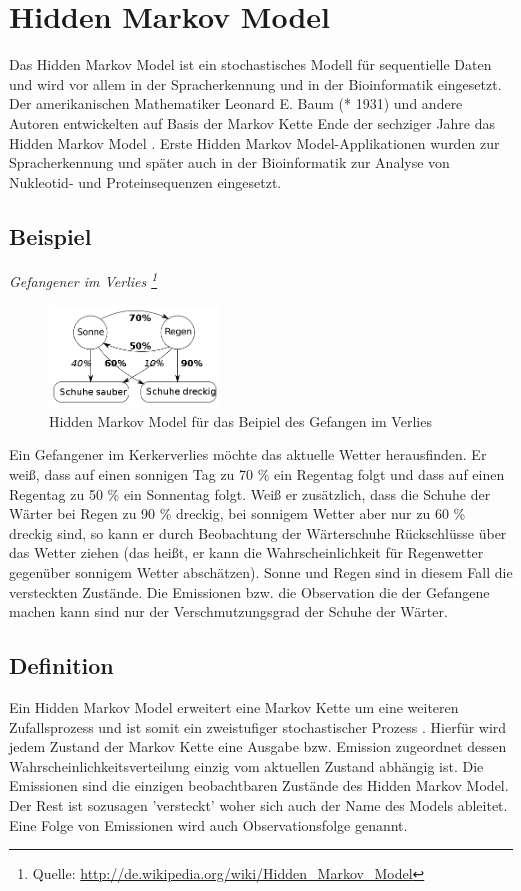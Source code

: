 \chapter{Hidden Markov Model}
\label{mainsec:hmm}

Das Hidden Markov Model ist ein stochastisches Modell für sequentielle Daten und wird vor allem in der Spracherkennung und in der Bioinformatik eingesetzt. 
Der amerikanischen Mathematiker Leonard E. Baum (* 1931) und andere Autoren entwickelten auf Basis der Markov Kette Ende der 
sechziger Jahre das Hidden Markov Model \cite{baum66}. Erste Hidden Markov Model-Applikationen wurden zur Spracherkennung und später auch in der Bioinformatik zur Analyse von Nukleotid- und Proteinsequenzen eingesetzt. 

\section{Beispiel}
\textit{ Gefangener im Verlies \footnote{Quelle: \url{http://de.wikipedia.org/wiki/Hidden_Markov_Model}}} \\

\begin{figure}[htbp] \centering
    \includegraphics[width=0.4\textwidth]{Bilder/Kap3/hmm_example.png}
    \caption{Hidden Markov Model für das Beipiel des Gefangen im Verlies}
    \label{fig:hmm_example}
\end{figure}

Ein Gefangener im Kerkerverlies möchte das aktuelle Wetter herausfinden. Er weiß, dass auf einen sonnigen Tag zu 70 \% ein Regentag folgt und dass auf einen Regentag zu 50 \% ein Sonnentag folgt. Weiß er zusätzlich, dass die Schuhe der Wärter bei Regen zu 90 \% dreckig, bei sonnigem Wetter aber nur zu 60 \% dreckig sind, so kann er durch Beobachtung der Wärterschuhe Rückschlüsse über das Wetter ziehen (das heißt, er kann die Wahrscheinlichkeit für Regenwetter gegenüber sonnigem Wetter abschätzen). Sonne und Regen sind in diesem Fall die versteckten Zustände. Die  Emissionen bzw. die Observation die der Gefangene machen kann sind nur der Verschmutzungsgrad der Schuhe der Wärter.

\section{Definition}
Ein Hidden Markov Model erweitert eine Markov Kette um eine weiteren Zufallsprozess und ist somit ein zweistufiger stochastischer Prozess \cite[67]{mmmFink}. Hierfür wird
jedem Zustand der Markov Kette eine Ausgabe bzw. Emission zugeordnet dessen Wahrscheinlichkeitsverteilung einzig vom aktuellen Zustand abhängig ist. Die Emissionen sind die einzigen beobachtbaren Zustände des Hidden Markov Model. Der Rest ist sozusagen 'versteckt' woher sich auch der Name des Models ableitet. Eine Folge von Emissionen wird auch Observationsfolge genannt.


